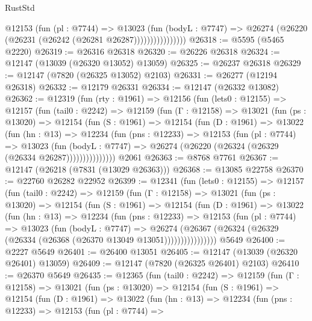 \begin{lexlean}{RustStd}
\begin{coremodule}
                      @12153
                        (fun (pl : @7744) =>
                        @13023
                          (fun (bodyL : @7747) =>
                          @26274 (@26220 (@26231 (@26242 (@26281 @26287))))))))))))))))
@26318 := @5595 (@5465 @2220)
@26319 := @26316 @26318
@26320 := @26226 @26318
@26324 := @12147 (@13039 (@26320 @13052) @13059)
@26325 := @26237 @26318
@26329 := @12147 (@7820 (@26325 @13052) @2103)
@26331 := @26277 (@12194 @26318)
@26332 := @12179 @26331
@26334 := @12147 (@26332 @13082)
@26362 := @12319
    (fun (rty : @1961) =>
    @12156
      (fun (lets0 : @12155) =>
      @12157
        (fun (tail0 : @2242) =>
        @12159
          (fun (Γ : @12158) =>
          @13021
            (fun (ps : @13020) =>
            @12154
              (fun (S : @1961) =>
              @12154
                (fun (D : @1961) =>
                @13022
                  (fun (hn : @13) =>
                  @12234
                    (fun (pns : @12233) =>
                    @12153
                      (fun (pl : @7744) =>
                      @13023
                        (fun (bodyL : @7747) =>
                        @26274 (@26220 (@26324 (@26329 (@26334 @26287)))))))))))))))
    @2061
@26363 := @8768 @7761
@26367 := @12147 (@26218 (@7831 (@13029 @26363)))
@26368 := @13085 @22758
@26370 := @22760 @26282 @22952
@26399 := @12341
    (fun (lets0 : @12155) =>
    @12157
      (fun (tail0 : @2242) =>
      @12159
        (fun (Γ : @12158) =>
        @13021
          (fun (ps : @13020) =>
          @12154
            (fun (S : @1961) =>
            @12154
              (fun (D : @1961) =>
              @13022
                (fun (hn : @13) =>
                @12234
                  (fun (pns : @12233) =>
                  @12153
                    (fun (pl : @7744) =>
                    @13023
                      (fun (bodyL : @7747) =>
                      @26274
                        (@26367
                          (@26324 (@26329 (@26334 (@26368 (@26370 @13049 @13051))))))))))))))))
    @5649
@26400 := @2227 @5649
@26401 := @26400 @13051
@26405 := @12147 (@13039 (@26320 @26401) @13059)
@26409 := @12147 (@7820 (@26325 @26401) @2103)
@26410 := @26370 @5649
@26435 := @12365
    (fun (tail0 : @2242) =>
    @12159
      (fun (Γ : @12158) =>
      @13021
        (fun (ps : @13020) =>
        @12154
          (fun (S : @1961) =>
          @12154
            (fun (D : @1961) =>
            @13022
              (fun (hn : @13) =>
              @12234
                (fun (pns : @12233) =>
                @12153
                  (fun (pl : @7744) =>

\end{coremodule}
\end{lexlean}
